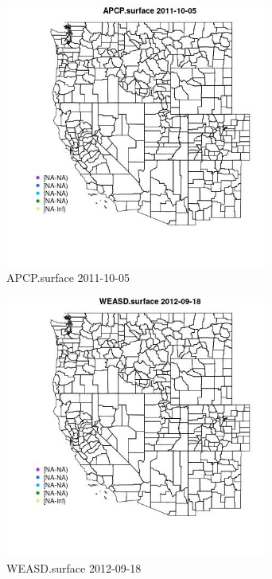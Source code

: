 \clearpage 

\begin{figure} 
\centering  
\includegraphics[width=0.77\textwidth]{Code_Outputs/ML_input_report_ML_input_PM25_Step5_part_d_de_duplicated_aves_ML_input_MapObsAPCPsurface2011-10-05.jpg} 
\caption{\label{fig:ML_input_report_ML_input_PM25_Step5_part_d_de_duplicated_aves_ML_inputMapObsAPCPsurface2011-10-05}APCP.surface 2011-10-05} 
\end{figure} 
 

\begin{figure} 
\centering  
\includegraphics[width=0.77\textwidth]{Code_Outputs/ML_input_report_ML_input_PM25_Step5_part_d_de_duplicated_aves_ML_input_MapObsWEASDsurface2012-09-18.jpg} 
\caption{\label{fig:ML_input_report_ML_input_PM25_Step5_part_d_de_duplicated_aves_ML_inputMapObsWEASDsurface2012-09-18}WEASD.surface 2012-09-18} 
\end{figure} 
 

